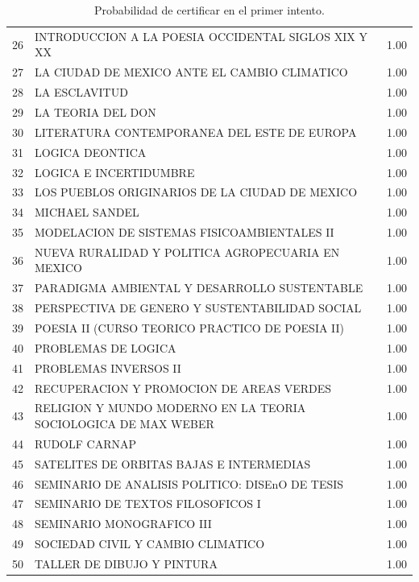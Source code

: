 \documentclass[12pt]{article}
\begin{document}
\begin{table}[ht]
{\begin{tabular}{rlr}
  26 & INTRODUCCION A LA POESIA OCCIDENTAL SIGLOS XIX Y XX & 1.00 \\ 
  27 & LA CIUDAD DE MEXICO ANTE EL CAMBIO CLIMATICO & 1.00 \\ 
  28 & LA ESCLAVITUD & 1.00 \\ 
  29 & LA TEORIA DEL DON & 1.00 \\ 
  30 & LITERATURA CONTEMPORANEA DEL ESTE DE EUROPA & 1.00 \\ 
  31 & LOGICA DEONTICA & 1.00 \\ 
  32 & LOGICA E INCERTIDUMBRE & 1.00 \\ 
  33 & LOS PUEBLOS ORIGINARIOS DE LA CIUDAD DE MEXICO & 1.00 \\ 
  34 & MICHAEL SANDEL & 1.00 \\ 
  35 & MODELACION DE SISTEMAS FISICOAMBIENTALES II & 1.00 \\ 
  36 & NUEVA RURALIDAD Y POLITICA AGROPECUARIA EN MEXICO & 1.00 \\ 
  37 & PARADIGMA AMBIENTAL Y DESARROLLO SUSTENTABLE & 1.00 \\ 
  38 & PERSPECTIVA DE GENERO Y SUSTENTABILIDAD SOCIAL & 1.00 \\ 
  39 & POESIA II (CURSO TEORICO PRACTICO DE POESIA II) & 1.00 \\ 
  40 & PROBLEMAS DE LOGICA & 1.00 \\ 
  41 & PROBLEMAS INVERSOS II & 1.00 \\ 
  42 & RECUPERACION Y PROMOCION DE AREAS VERDES & 1.00 \\ 
  43 & RELIGION Y MUNDO MODERNO EN LA TEORIA SOCIOLOGICA DE MAX WEBER & 1.00 \\ 
  44 & RUDOLF CARNAP & 1.00 \\ 
  45 & SATELITES DE ORBITAS BAJAS E INTERMEDIAS & 1.00 \\ 
  46 & SEMINARIO DE ANALISIS POLITICO: DISEnO DE TESIS & 1.00 \\ 
  47 & SEMINARIO DE TEXTOS FILOSOFICOS I & 1.00 \\ 
  48 & SEMINARIO MONOGRAFICO III & 1.00 \\ 
  49 & SOCIEDAD CIVIL Y CAMBIO CLIMATICO & 1.00 \\ 
  50 & TALLER DE DIBUJO Y PINTURA & 1.00 \\ 
   \hline
\end{tabular}
}
\caption{\label{Prob_Cert_Intento_1}Probabilidad de certificar en el primer intento.}
\end{table}
\end{document}
